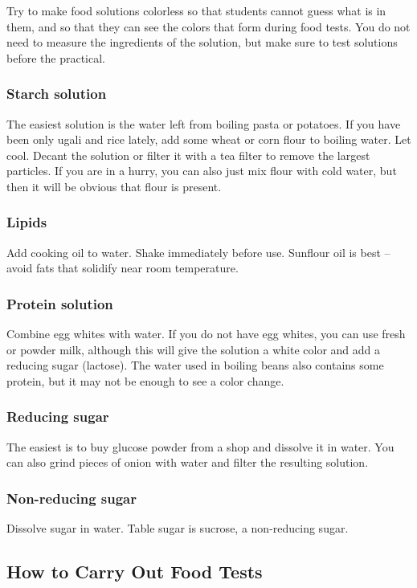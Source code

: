 \begin{itemize}
Try to make food solutions colorless so that students cannot guess what is in them, and so that they can see the colors that form during food tests. You do not need to measure the ingredients of the solution, but make sure to test solutions before the practical.

\subsubsection{Starch solution}
The easiest solution is the water left from boiling pasta or potatoes. If you have been only ugali and rice lately, add some wheat or corn flour to boiling water. Let cool. Decant the solution or filter it with a tea filter to remove the largest particles. If you are in a hurry, you can also just mix flour with cold water, but then it will be obvious that flour is present.

\subsubsection{Lipids}
Add cooking oil to water. Shake immediately before use. Sunflour oil is best – avoid fats that solidify near room temperature.

\subsubsection{Protein solution}
Combine egg whites with water. If you do not have egg whites, you can use fresh or powder milk, although this will give the solution a white color and add a reducing sugar (lactose). The water used in boiling beans also contains some protein, but it may not be enough to see a color change.

\subsubsection{Reducing sugar}
The easiest is to buy glucose powder from a shop and dissolve it in water. You can also grind pieces of onion with water and filter the resulting solution.

\subsubsection{Non-reducing sugar}
Dissolve sugar in water. Table sugar is sucrose, a non-reducing sugar.

\subsection{How to Carry Out Food Tests}


\end{itemize}

